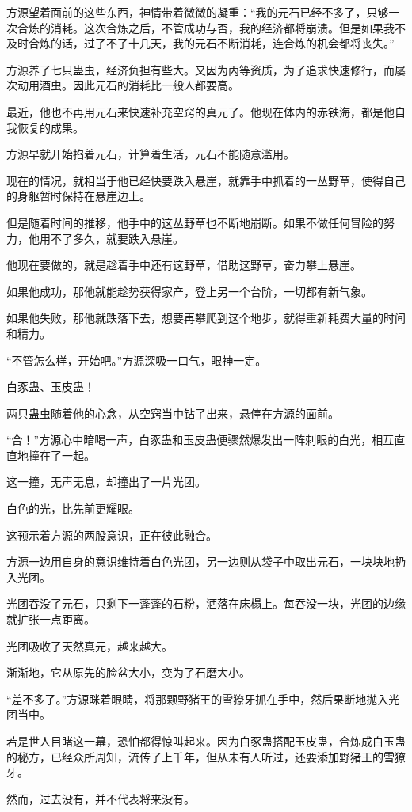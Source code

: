 \begin{this_body}
方源望着面前的这些东西，神情带着微微的凝重：“我的元石已经不多了，只够一次合炼的消耗。这次合炼之后，不管成功与否，我的经济都将崩溃。但是如果我不及时合炼的话，过了不了十几天，我的元石不断消耗，连合炼的机会都将丧失。”

方源养了七只蛊虫，经济负担有些大。又因为丙等资质，为了追求快速修行，而屡次动用酒虫。因此元石的消耗比一般人都要高。

最近，他也不再用元石来快速补充空窍的真元了。他现在体内的赤铁海，都是他自我恢复的成果。

方源早就开始掐着元石，计算着生活，元石不能随意滥用。

现在的情况，就相当于他已经快要跌入悬崖，就靠手中抓着的一丛野草，使得自己的身躯暂时保持在悬崖边上。

但是随着时间的推移，他手中的这丛野草也不断地崩断。如果不做任何冒险的努力，他用不了多久，就要跌入悬崖。

他现在要做的，就是趁着手中还有这野草，借助这野草，奋力攀上悬崖。

如果他成功，那他就能趁势获得家产，登上另一个台阶，一切都有新气象。

如果他失败，那他就跌落下去，想要再攀爬到这个地步，就得重新耗费大量的时间和精力。

“不管怎么样，开始吧。”方源深吸一口气，眼神一定。

白豕蛊、玉皮蛊！

两只蛊虫随着他的心念，从空窍当中钻了出来，悬停在方源的面前。

“合！”方源心中暗喝一声，白豕蛊和玉皮蛊便骤然爆发出一阵刺眼的白光，相互直直地撞在了一起。

这一撞，无声无息，却撞出了一片光团。

白色的光，比先前更耀眼。

这预示着方源的两股意识，正在彼此融合。

方源一边用自身的意识维持着白色光团，另一边则从袋子中取出元石，一块块地扔入光团。

光团吞没了元石，只剩下一蓬蓬的石粉，洒落在床榻上。每吞没一块，光团的边缘就扩张一点距离。

光团吸收了天然真元，越来越大。

渐渐地，它从原先的脸盆大小，变为了石磨大小。

“差不多了。”方源眯着眼睛，将那颗野猪王的雪獠牙抓在手中，然后果断地抛入光团当中。

若是世人目睹这一幕，恐怕都得惊叫起来。因为白豕蛊搭配玉皮蛊，合炼成白玉蛊的秘方，已经众所周知，流传了上千年，但从未有人听过，还要添加野猪王的雪獠牙。

然而，过去没有，并不代表将来没有。


\end{this_body}
